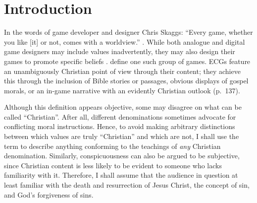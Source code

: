 \chapter{Introduction}



In the words of game developer and designer Chris Skaggs: ``Every game, whether you like [it] or not, comes with a worldview.'' \parencite[136]{schut_making_2013}. While both analogue and digital game designers may include values inadvertently, they may also design their games to promote specific beliefs \parencite{bogost_persuasive_2007, flanagan_values_2014}. \textcite{schut_making_2013} define one such group of games. \acp{ECG} feature an unambiguously Christian point of view through their content; they achieve this through the inclusion of Bible stories or passages, obvious displays of gospel morals, or an in-game narrative with an evidently Christian outlook (p.\ 137).


Although this definition appears objective, some may disagree on what can be called ``Christian''. After all, different denominations sometimes advocate for conflicting moral instructions. Hence, to avoid making arbitrary distinctions between which values are truly ``Christian'' and which are not, I shall use the term to describe anything conforming to the teachings of \textit{any} Christian denomination. Similarly, conspicuousness can also be argued to be subjective, since Christian content is less likely to be evident to someone who lacks familiarity with it. Therefore, I shall assume that the audience in question at least familiar with the death and resurrection of Jesus Christ, the concept of sin, and God's forgiveness of sins.


